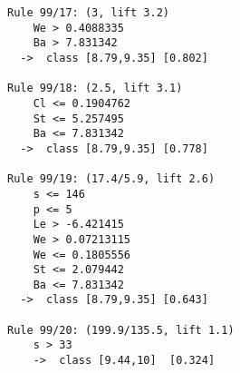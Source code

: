 \begin{tcolorbox}[title=Reglas de clasificación para identificar intervalos de notas.]
\begin{multicols}{3}
\begin{verbatim}
Rule 99/17: (3, lift 3.2)
	We > 0.4088335
	Ba > 7.831342
  ->  class [8.79,9.35] [0.802]

Rule 99/18: (2.5, lift 3.1)
	Cl <= 0.1904762
	St <= 5.257495
	Ba <= 7.831342
  ->  class [8.79,9.35] [0.778]

Rule 99/19: (17.4/5.9, lift 2.6)
	s <= 146
	p <= 5
	Le > -6.421415
	We > 0.07213115
	We <= 0.1805556
	St <= 2.079442
	Ba <= 7.831342
  ->  class [8.79,9.35] [0.643]

Rule 99/20: (199.9/135.5, lift 1.1)
	s > 33
	->  class [9.44,10]  [0.324]
    \end{verbatim}
  \end{multicols}
\label{rules7}
\end{tcolorbox}